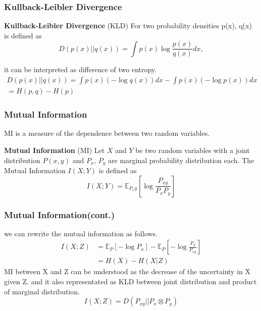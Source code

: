 \documentclass{beamer}
\newcommand{\expt}{\mathbb{E}}
\begin{document}
\begin{frame}
	\frametitle{Kullback-Leibler Divergence}
	\begin{definition}
		\textbf{Kullback-Leibler Divergence} (KLD) For two probability densities p(x), q(x) is defined as
		\begin{equation*}D(p(x)||q(x))
			= \int p(x) \log \frac{p(x)}{q(x)}dx,\end{equation*}
	\end{definition}
	it can be interpreted as difference of two entropy.
	\begin{align*}
		D(p(x)||q(x)) = \int p(x) (-\log{q(x)})dx - \int p(x) (-\log{p(x)})dx \\
		= H(p, q) - H(p)
	\end{align*}
\end{frame}

\begin{frame}
	\frametitle{Mutual Information} 
	MI is a measure of the dependence between two random variables.
	\begin{definition} \label{def:mutual_information}
		\textbf{Mutual Information} (MI) Let $X$ and $Y$ be two random variables with a joint
		distribution $P(x, y)$ and $P_x$, $P_y$ are marginal probability distribution each.
		The Mutual Information $I(X;Y)$ is defined as
		\begin{equation*}I(X;Y) = \expt_{P_xy} [\log\frac{P_{xy}}{P_x P_y}]\end{equation*}
	\end{definition}	
\end{frame}

\begin{frame}
	\frametitle{Mutual Information(cont.)}
	we can rewrite the mutual information as follows.
	\begin{align*}
		I(X;Z)&= \expt_P[-\log P_x] - \expt_P[-\log\frac{P_y}{P_{xy}}]\\
		&= H(X)-H(X|Z)
	\end{align*}
	MI between X and Z can be understood as the decrease of the uncertainty in X given Z.
	and it also representated as KLD between joint distribution and product of marginal distribution.
	\begin{equation*} I(X;Z) = D(P_{xy}||P_{x} \otimes P_{y}) \end{equation*}
\end{frame}
\end{document}
